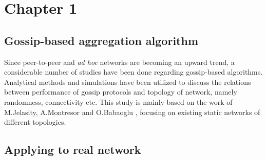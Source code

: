 \documentclass[11pt,a4paper]{article}
\begin{document}
\newpage

\section{Chapter 1}
\subsection{Gossip-based aggregation algorithm}
Since peer-to-peer and {\it ad hoc} networks are becoming an upward trend, a considerable number of studies have been done regarding gossip-based algorithms. Analytical methods and simulations have been utilized to discuss the relations between performance of gossip protocols and topology of network, namely randomness, connectivity etc. This study is mainly based on the work of M.Jelasity, A.Montresor and O.Babaoglu \cite{jelasity_gossip-based_2005}, focusing on existing static networks of different topologies.\\

\subsection{Applying to real network}
\end{document}
